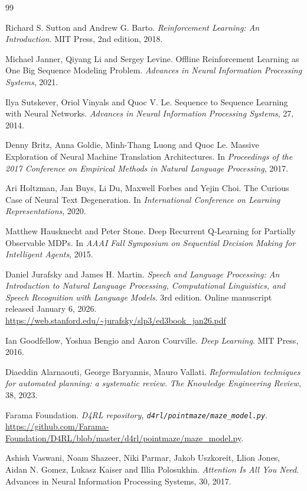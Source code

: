 ﻿\documentclass[12pt,a4paper]{article}
\theoremstyle{definition}
\begin{document}
\begin{thebibliography}{99}

Richard S. Sutton and Andrew G. Barto.
\textit{Reinforcement Learning: An Introduction}.
MIT Press, 2nd edition, 2018.

Michael Janner, Qiyang Li and Sergey Levine.
Offline Reinforcement Learning as One Big Sequence Modeling Problem.
\textit{Advances in Neural Information Processing Systems}, 2021.

Ilya Sutskever, Oriol Vinyals and Quoc V. Le.
Sequence to Sequence Learning with Neural Networks.
\textit{Advances in Neural Information Processing Systems}, 27, 2014.

Denny Britz, Anna Goldie, Minh-Thang Luong and Quoc Le.
Massive Exploration of Neural Machine Translation Architectures.
In \textit{Proceedings of the 2017 Conference on Empirical Methods in Natural Language Processing},
2017.

Ari Holtzman, Jan Buys, Li Du, Maxwell Forbes and Yejin Choi.
The Curious Case of Neural Text Degeneration.
In \textit{International Conference on Learning Representations}, 2020.

Matthew Hausknecht and Peter Stone.
Deep Recurrent Q-Learning for Partially Observable MDPs.
In \textit{AAAI Fall Symposium on Sequential Decision Making for Intelligent Agents}, 2015.

Daniel Jurafsky and James H. Martin.
\textit{Speech and Language Processing: An Introduction to Natural Language Processing, Computational Linguistics, and Speech Recognition with Language Models}.
3rd edition.
Online manuscript released January 6, 2026.
\url{https://web.stanford.edu/~jurafsky/slp3/ed3book_jan26.pdf}

Ian Goodfellow, Yoshua Bengio and Aaron Courville.
\textit{Deep Learning}.
MIT Press, 2016.

Diaeddin Alarnaouti, George Baryannis, Mauro Vallati.
\textit{Reformulation techniques for automated planning: a systematic review}.
\textit{The Knowledge Engineering Review}, 38, 2023.

Farama Foundation.
\textit{D4RL repository, \texttt{d4rl/pointmaze/maze\_model.py}}.
\url{https://github.com/Farama-Foundation/D4RL/blob/master/d4rl/pointmaze/maze_model.py}.

Ashish Vaswani, Noam Shazeer, Niki Parmar, Jakob Uszkoreit, Llion Jones,
Aidan N. Gomez, Lukasz Kaiser and Illia Polosukhin.
\textit{Attention Is All You Need}.
Advances in Neural Information Processing Systems, 30, 2017.

\end{thebibliography}
\end{document}
